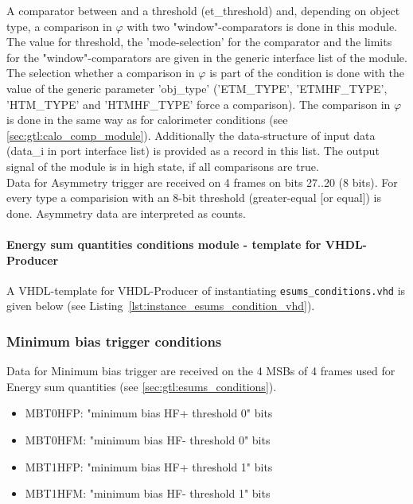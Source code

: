 A comparator between \et and a threshold (et\_threshold) and, depending on object type, a comparison in $\varphi$ with 
two "window"-comparators is done in this module. 
The value for \et threshold, the 'mode-selection' for the \et comparator and the limits for the "window"-comparators are given in the generic interface list of the module.
The selection whether a comparison in $\varphi$ is part of the condition is done with the value of the generic parameter 'obj\_type' 
('ETM\_TYPE', 'ETMHF\_TYPE', 'HTM\_TYPE' and 'HTMHF\_TYPE' force a comparison).
The comparison in $\varphi$ is done in the same way as for calorimeter conditions (see \ref{sec:gtl:calo_comp_module}).
Additionally the data-structure of input data (data\_i in port interface list) is provided
as a record in this list. The output signal of the module is in high state, if all comparisons are true.\\
Data for Asymmetry trigger are received on 4 frames on bits 27..20 (8 bits). For every type a comparision with an 8-bit threshold (greater-equal [or equal]) is done.
Asymmetry data are interpreted as counts.

\paragraph{Energy sum quantities conditions module - template for VHDL-Producer}
A VHDL-template for VHDL-Producer of instantiating \texttt{esums\_conditions.vhd} is given below (see Listing~\ref{lst:instance_esums_condition_vhd}).\\

\subsubsection{Minimum bias trigger conditions}
\label{sec:gtl:min_bias_conditions}

Data for Minimum bias trigger are received on the 4 MSBs of 4 frames used for Energy sum quantities (see \ref{sec:gtl:esums_conditions}). 

\begin{itemize}
\item MBT0HFP: "minimum bias HF+ threshold 0" bits
\item MBT0HFM: "minimum bias HF- threshold 0" bits
\item MBT1HFP: "minimum bias HF+ threshold 1" bits
\item MBT1HFM: "minimum bias HF- threshold 1" bits
\end{itemize}

